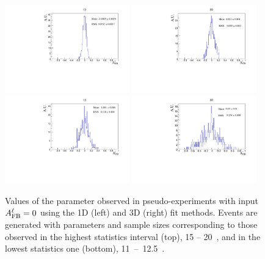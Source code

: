 \begin{figure}[h!]
\centering

\includegraphics[width=0.48\textwidth]{Lmumu/figs/toys3D/B1/1D/toys3D_afb.pdf}
\includegraphics[width=0.48\textwidth]{Lmumu/figs/toys3D/B1/3D/toys3D_afb.pdf}
\includegraphics[width=0.48\textwidth]{Lmumu/figs/toys3D/B2/1D/toys3D_afb.pdf}
\includegraphics[width=0.48\textwidth]{Lmumu/figs/toys3D/B2/3D/toys3D_afb.pdf}
\caption{Values of the \afbl parameter observed in pseudo-experiments 
with input $A_{\rm FB}^\ell = 0$ using the 1D (left) and 3D (right) fit methods. Events 
are generated with parameters and sample sizes corresponding to those observed in the highest 
statistics interval (top), 15 -- 20~\gevgevcccc, and in the lowest statistics one (bottom), \mbox{11 -- 12.5~\gevgevcccc}. }
\label{fig:3DtoyResults}
\end{figure}


